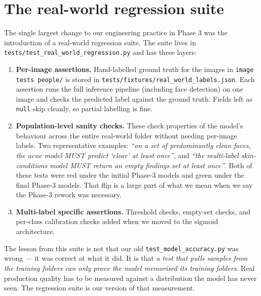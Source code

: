 \documentclass[11pt,a4paper,oneside]{report}
\begin{document}
\section{The real-world regression suite}\label{sec:regression}

The single largest change to our engineering practice in Phase 3
was the introduction of a real-world regression suite. The suite
lives in \texttt{tests/test\_real\_world\_regression.py} and has
three layers:

\begin{enumerate}
    \item \textbf{Per-image assertions.} Hand-labelled ground truth
        for the images in \texttt{image tests people/} is stored in
        \texttt{tests/fixtures/real\_world\_labels.json}. Each
        assertion runs the full inference pipeline (including face
        detection) on one image and checks the predicted label
        against the ground truth. Fields left as \texttt{null}
        skip cleanly, so partial labelling is fine.
    \item \textbf{Population-level sanity checks.} These check
        properties of the model's behaviour across the entire
        real-world folder without needing per-image labels. Two
        representative examples:
        \emph{``on a set of predominantly clean faces, the acne
        model MUST predict `clear' at least once''}, and
        \emph{``the multi-label skin-conditions model MUST return an
        empty findings set at least once''}. Both of these tests
        were red under the initial Phase-3 models and green under
        the final Phase-3 models. That flip is a large part of what
        we mean when we say the Phase-3 rework was necessary.
    \item \textbf{Multi-label specific assertions.} Threshold
        checks, empty-set checks, and per-class calibration checks
        added when we moved to the sigmoid architecture.
\end{enumerate}

The lesson from this suite is not that our old
\texttt{test\_model\_accuracy.py} was wrong --- it was correct at
what it did. It is that \emph{a test that pulls samples from the
training folders can only prove the model memorised its training
folders}. Real production quality has to be measured against a
distribution the model has never seen. The regression suite is our
version of that measurement.

\end{document}
